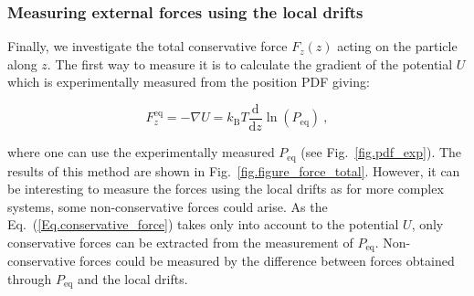 \subsubsection{Measuring external forces using the local drifts}
Finally, we investigate the total conservative force $F_z(z)$ acting on the particle along $z$. The first way to measure it is to calculate the gradient of the potential $U$ which is experimentally measured from the position \gls{PDF} giving:


\begin{equation}
	F_z^\mathrm{eq} = -\nabla U = k_\mathrm{B}T \frac{\mathrm{d}}{\mathrm{d} z} \ln (P_\mathrm{eq}) ~,
	\label{Eq.conservative_force}
\end{equation}

where one can use the experimentally measured $P_\mathrm{eq}$ (see Fig.~\ref{fig.pdf_exp}). The results of this method are shown in Fig.~\ref{fig.figure_force_total}. However, it can be interesting to measure the forces using the local drifts as for more complex systems, some non-conservative forces could arise. As the Eq.~(\ref{Eq.conservative_force}) takes only into account to the potential $U$, only conservative forces can be extracted from the measurement of $P_\mathrm{eq}$. Non-conservative forces could be measured by the difference between forces obtained through $P_\mathrm{eq}$ and the local drifts.  


